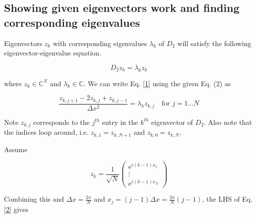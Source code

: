 \documentclass{article}
\newcommand{\C}{\mathbb{C}}
\newcommand{\E}{\mathrm{e}}
\begin{document}
\subsection{Showing given eigenvectors work and finding corresponding eigenvalues}

Eigenvectors $z_k$ with corresponding eigenvalues $\lambda_k$ of $D_2$ will satisfy the following eigenvector-eigenvalue equation. 

\[
	D_2 z_k = \lambda_k z_k \tag{$\star 1$} \label{1}
\]

where $z_k \in \C^N$ and $\lambda_k \in \C$. We can write Eq. \eqref{1} using the given Eq. (2) as

\[
	\frac{z_{k,j+1} - 2 z_{k,j} + z_{k,j-1}}{\Delta x^2} = \lambda_k z_{k,j} \quad \text{for } j = 1 \dots N \tag{$\star 2$} \label{2}
\]

Note $z_{k,j}$ corresponds to the $j^{th}$ entry in the $k^{th}$ eigenvector of $D_2$. Also note that the indices loop around, i.e. $z_{k,1} = z_{k,N+1}$ and $z_{k,0} = z_{k,N}$.

Assume

\[
	z_k = \frac{ 1 }{ \sqrt{N} } \begin{pmatrix}
	\E^{i (k-1) x_1} \\
	\vdots \\
	\E^{i (k-1) x_N}
	\end{pmatrix}
\]

Combining this and $\Delta x = \frac{ 2\pi }{ N }$ and $x_j = (j-1) \Delta x = \frac{ 2\pi }{ N } (j-1)$, the LHS of Eq. \eqref{2} gives
\end{document}
